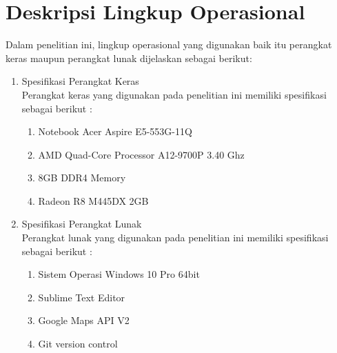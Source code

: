 \section{Deskripsi Lingkup Operasional}
Dalam penelitian ini, lingkup operasional yang digunakan baik itu perangkat
keras maupun perangkat lunak dijelaskan sebagai berikut:
\begin{enumerate}
	\item Spesifikasi Perangkat Keras\\
	Perangkat keras yang digunakan pada penelitian ini memiliki spesifikasi sebagai berikut :
	\begin{enumerate}
		\item Notebook Acer Aspire E5-553G-11Q
		\item AMD Quad-Core Processor A12-9700P 3.40 Ghz
		\item 8GB DDR4 Memory
		\item Radeon R8 M445DX 2GB
	\end{enumerate}
	\item Spesifikasi Perangkat Lunak\\
	Perangkat lunak yang digunakan pada penelitian ini memiliki spesifikasi sebagai berikut :
		\begin{enumerate}
		\item Sistem Operasi Windows 10 Pro 64bit
		\item Sublime Text Editor
		\item Google Maps API V2
		\item Git version control
	\end{enumerate}
\end{enumerate}
